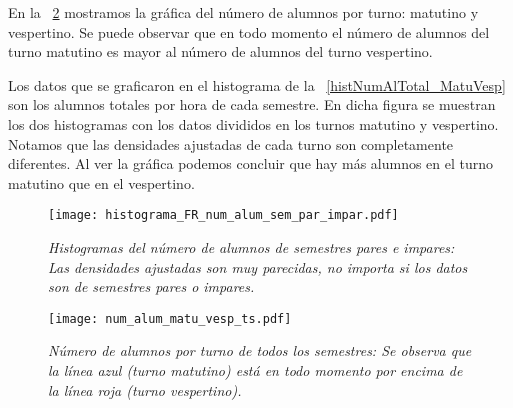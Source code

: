 

En la \figurename{~\ref{NumAlTotal_MatuVesp_ts}} mostramos la gráfica del número de alumnos por turno: matutino y vespertino. Se puede observar que en todo momento el número de alumnos del turno matutino es mayor al número de alumnos del turno vespertino.


Los datos que se graficaron en el histograma de la \figurename{~\ref{histNumAlTotal_MatuVesp}} son los alumnos totales por hora de cada semestre. En dicha figura se muestran los dos histogramas con los datos divididos en los turnos matutino y vespertino. Notamos que las densidades ajustadas de cada turno son completamente diferentes. Al ver la gráfica podemos concluir que hay más alumnos en el turno matutino que en el vespertino.

\begin{figure}[H]
\centering
\texttt{[image: histograma\_FR\_num\_alum\_sem\_par\_impar.pdf]} %
\caption[\textit{Histogramas del número de alumnos de semestres pares e impares}]{\textit{Histogramas del número de alumnos de semestres pares e impares: Las densidades ajustadas son muy parecidas, no importa si los datos son de semestres pares o impares.}}\label{histNumAlTotal_ParImpar}
\end{figure}

\begin{figure}[H]
\centering
\texttt{[image: num\_alum\_matu\_vesp\_ts.pdf]} %
\caption[\textit{Número de alumnos por turno de todos los semestres}]{\textit{Número de alumnos por turno de todos los semestres: Se observa que la línea azul (turno matutino) está en todo momento por encima de la línea roja (turno vespertino).}}\label{NumAlTotal_MatuVesp_ts}
\end{figure}


